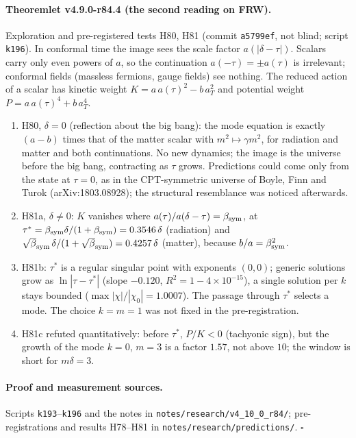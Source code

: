 \paragraph{Theoremlet v4.9.0-r84.4 (the second reading on FRW).}
Exploration and pre-registered tests H80, H81 (commit \texttt{a5799ef}, not blind; script \texttt{k196}).  In conformal time the image sees
the scale factor \(a(|\delta-\tau|)\).  Scalars carry only even powers of \(a\), so the continuation \(a(-\tau)=\pm a(\tau)\) is irrelevant;
conformal fields (massless fermions, gauge fields) see nothing.  The reduced action of a scalar has kinetic weight
\(K=a\,a(\tau)^2-b\,a_T^2\) and potential weight \(P=a\,a(\tau)^4+b\,a_T^4\).
\begin{enumerate}[leftmargin=2em]
\item[(a)] H80, \(\delta=0\) (reflection about the big bang): the mode equation is exactly \((a-b)\) times that of the matter scalar with
\(m^2\mapsto\gamma m^2\), for radiation and matter and both continuations.  No new dynamics; the image is the universe before the big bang,
contracting as \(\tau\) grows.  Predictions could come only from the state at \(\tau=0\), as in the CPT-symmetric universe of Boyle, Finn and
Turok (arXiv:1803.08928); the structural resemblance was noticed afterwards.
\item[(b)] H81a, \(\delta\neq0\): \(K\) vanishes where \(a(\tau)/a(\delta-\tau)=\beta_{\mathrm{sym}}\), at \(\tau^*=\beta_{\mathrm{sym}}\delta/(1+\beta_{\mathrm{sym}})=0.3546\,\delta\) (radiation) and
\(\sqrt\bsym\,\delta/(1+\sqrt\bsym)=0.4257\,\delta\) (matter), because \(b/a=\beta_{\mathrm{sym}}^2\).
\item[(c)] H81b: \(\tau^*\) is a regular singular point with exponents \((0,0)\); generic solutions grow as \(\ln|\tau-\tau^*|\) (slope \(-0.120\),
\(R^2=1-4\times10^{-15}\)), a single solution per \(k\) stays bounded (\(\max|\chi|/|\chi_0|=1.0007\)).  The passage through \(\tau^*\) selects a
mode.  The choice \(k=m=1\) was not fixed in the pre-registration.
\item[(d)] H81c refuted quantitatively: before \(\tau^*\), \(P/K<0\) (tachyonic sign), but the growth of the mode \(k=0\), \(m=3\) is a factor
\(1.57\), not above \(10\); the window is short for \(m\delta=3\).
\end{enumerate}

\paragraph{Proof and measurement sources.}
Scripts \texttt{k193}--\texttt{k196} and the notes in \texttt{notes/\allowbreak research/\allowbreak v4\_10\_0\_r84/}; pre-registrations and results
H78--H81 in \texttt{notes/\allowbreak research/\allowbreak predictions/}.  \(\square\)

